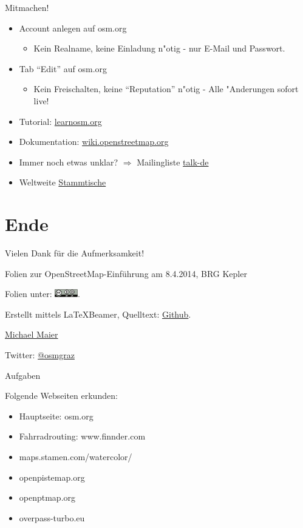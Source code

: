 \documentclass{beamer}
\begin{document}
\begin{frame}{Mitmachen!}
\begin{itemize}
  \item Account anlegen auf osm.org
	\begin{itemize}
		\item Kein Realname, keine Einladung n"otig - nur E-Mail und Passwort.
	\end{itemize}
  \item Tab "`Edit"' auf osm.org
	\begin{itemize}
		\item Kein Freischalten, keine "`Reputation"' n"otig - Alle "Anderungen sofort live!
	\end{itemize}
  \item Tutorial:  \href{http://learnosm.org/}{learnosm.org} 
  \item Dokumentation: \href{http://wiki.openstreetmap.org}{wiki.openstreetmap.org}
  \item Immer noch etwas unklar? $\Rightarrow$ Mailingliste \href{http://lists.openstreetmap.org/listinfo/talk-de}{talk-de}
  \item Weltweite \href{http://usergroups.openstreetmap.de/}{Stammtische}
\end{itemize}

\end{frame}


\section{Ende}

\begin{frame}{Vielen Dank für die Aufmerksamkeit!}

  Folien zur OpenStreetMap-Einführung am 8.4.2014, BRG Kepler
\vspace{1cm}

Folien unter: \includegraphics[width=1cm]{cc-by-sa.pdf}.
\vspace{1cm}

Erstellt mittels \LaTeX Beamer, Quelltext: \href{https://github.com/species/vortrag-osm-kepler}{Github}.
\vspace{1cm}

\href{mailto:michael.maier@student.tugraz.at}{Michael Maier}

Twitter: \href{https://twitter.com/osmgraz}{@osmgraz}
\end{frame}

\begin{frame}{Aufgaben}

  Folgende Webseiten erkunden:

  \begin{itemize}
    \item Hauptseite: osm.org
    \item Fahrradrouting: www.finnder.com
    \item maps.stamen.com/watercolor/
    \item openpistemap.org
    \item openptmap.org
    \item overpass-turbo.eu
  \end{itemize}

\end{frame}
\end{document}
